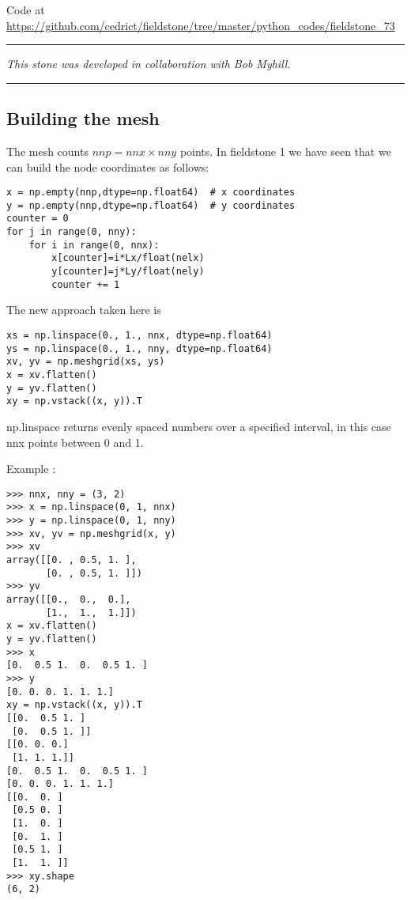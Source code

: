 

\begin{center}
Code at \url{https://github.com/cedrict/fieldstone/tree/master/python_codes/fieldstone_73}
\end{center}

\par\noindent\rule{\textwidth}{0.4pt}

{\sl This stone was developed in collaboration with Bob Myhill}. 

\par\noindent\rule{\textwidth}{0.4pt}


\subsection*{Building the mesh}

The mesh counts $nnp=nnx \times nny$ points. 
In fieldstone 1 we have seen that we can build the node coordinates as follows:
\begin{lstlisting}
x = np.empty(nnp,dtype=np.float64)  # x coordinates
y = np.empty(nnp,dtype=np.float64)  # y coordinates
counter = 0
for j in range(0, nny):
    for i in range(0, nnx):
        x[counter]=i*Lx/float(nelx)
        y[counter]=j*Ly/float(nely)
        counter += 1
\end{lstlisting}

The new approach taken here is
\begin{lstlisting}
xs = np.linspace(0., 1., nnx, dtype=np.float64)
ys = np.linspace(0., 1., nny, dtype=np.float64)
xv, yv = np.meshgrid(xs, ys)
x = xv.flatten()
y = yv.flatten()
xy = np.vstack((x, y)).T
\end{lstlisting}

np.linspace returns evenly spaced numbers over a specified interval, 
in this case nnx points between 0 and 1. 

Example :
\begin{verbatim}
>>> nnx, nny = (3, 2)
>>> x = np.linspace(0, 1, nnx)
>>> y = np.linspace(0, 1, nny)
>>> xv, yv = np.meshgrid(x, y)
>>> xv
array([[0. , 0.5, 1. ],
       [0. , 0.5, 1. ]])
>>> yv
array([[0.,  0.,  0.],
       [1.,  1.,  1.]])
x = xv.flatten()
y = yv.flatten()
>>> x
[0.  0.5 1.  0.  0.5 1. ]
>>> y
[0. 0. 0. 1. 1. 1.]
xy = np.vstack((x, y)).T
[[0.  0.5 1. ]
 [0.  0.5 1. ]]
[[0. 0. 0.]
 [1. 1. 1.]]
[0.  0.5 1.  0.  0.5 1. ]
[0. 0. 0. 1. 1. 1.]
[[0.  0. ]
 [0.5 0. ]
 [1.  0. ]
 [0.  1. ]
 [0.5 1. ]
 [1.  1. ]]
>>> xy.shape
(6, 2)
\end{verbatim}


